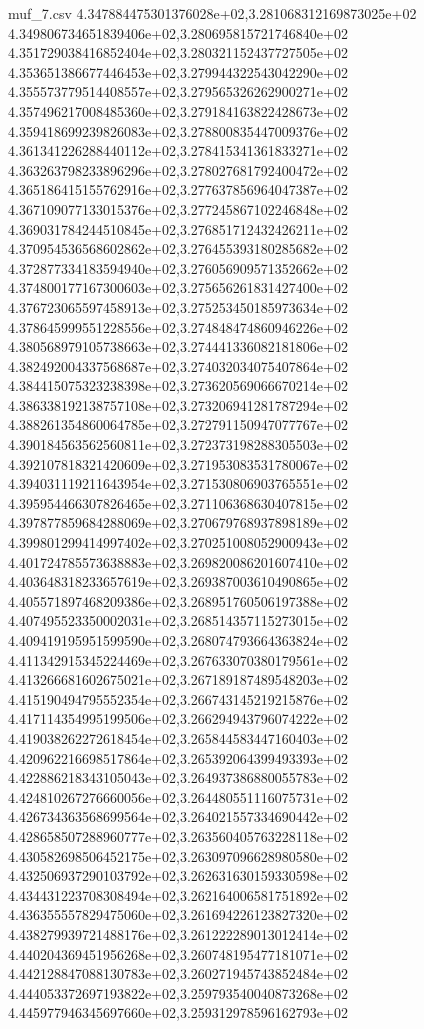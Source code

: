 \begin{filecontents*}{muf_7.csv}
4.347884475301376028e+02,3.281068312169873025e+02
4.349806734651839406e+02,3.280695815721746840e+02
4.351729038416852404e+02,3.280321152437727505e+02
4.353651386677446453e+02,3.279944322543042290e+02
4.355573779514408557e+02,3.279565326262900271e+02
4.357496217008485360e+02,3.279184163822428673e+02
4.359418699239826083e+02,3.278800835447009376e+02
4.361341226288440112e+02,3.278415341361833271e+02
4.363263798233896296e+02,3.278027681792400472e+02
4.365186415155762916e+02,3.277637856964047387e+02
4.367109077133015376e+02,3.277245867102246848e+02
4.369031784244510845e+02,3.276851712432426211e+02
4.370954536568602862e+02,3.276455393180285682e+02
4.372877334183594940e+02,3.276056909571352662e+02
4.374800177167300603e+02,3.275656261831427400e+02
4.376723065597458913e+02,3.275253450185973634e+02
4.378645999551228556e+02,3.274848474860946226e+02
4.380568979105738663e+02,3.274441336082181806e+02
4.382492004337568687e+02,3.274032034075407864e+02
4.384415075323238398e+02,3.273620569066670214e+02
4.386338192138757108e+02,3.273206941281787294e+02
4.388261354860064785e+02,3.272791150947077767e+02
4.390184563562560811e+02,3.272373198288305503e+02
4.392107818321420609e+02,3.271953083531780067e+02
4.394031119211643954e+02,3.271530806903765551e+02
4.395954466307826465e+02,3.271106368630407815e+02
4.397877859684288069e+02,3.270679768937898189e+02
4.399801299414997402e+02,3.270251008052900943e+02
4.401724785573638883e+02,3.269820086201607410e+02
4.403648318233657619e+02,3.269387003610490865e+02
4.405571897468209386e+02,3.268951760506197388e+02
4.407495523350002031e+02,3.268514357115273015e+02
4.409419195951599590e+02,3.268074793664363824e+02
4.411342915345224469e+02,3.267633070380179561e+02
4.413266681602675021e+02,3.267189187489548203e+02
4.415190494795552354e+02,3.266743145219215876e+02
4.417114354995199506e+02,3.266294943796074222e+02
4.419038262272618454e+02,3.265844583447160403e+02
4.420962216698517864e+02,3.265392064399493393e+02
4.422886218343105043e+02,3.264937386880055783e+02
4.424810267276660056e+02,3.264480551116075731e+02
4.426734363568699564e+02,3.264021557334690442e+02
4.428658507288960777e+02,3.263560405763228118e+02
4.430582698506452175e+02,3.263097096628980580e+02
4.432506937290103792e+02,3.262631630159330598e+02
4.434431223708308494e+02,3.262164006581751892e+02
4.436355557829475060e+02,3.261694226123827320e+02
4.438279939721488176e+02,3.261222289013012414e+02
4.440204369451956268e+02,3.260748195477181071e+02
4.442128847088130783e+02,3.260271945743852484e+02
4.444053372697193822e+02,3.259793540040873268e+02
4.445977946345697660e+02,3.259312978596162793e+02

\end{filecontents*}
